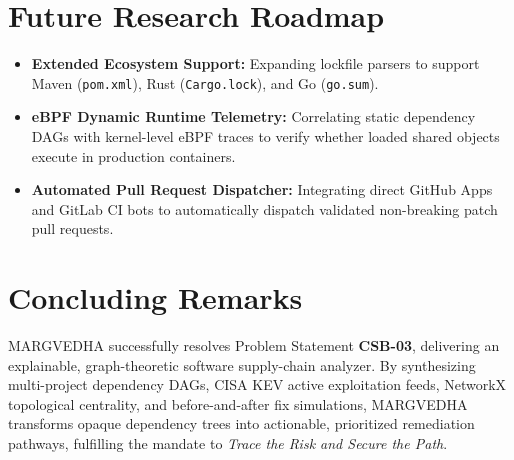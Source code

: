 \documentclass[12pt,a4paper,oneside]{report}
\begin{document}
\section{Future Research Roadmap}
\begin{itemize}
    \item \textbf{Extended Ecosystem Support:} Expanding lockfile parsers to support Maven (\texttt{pom.xml}), Rust (\texttt{Cargo.lock}), and Go (\texttt{go.sum}).
    \item \textbf{eBPF Dynamic Runtime Telemetry:} Correlating static dependency DAGs with kernel-level eBPF traces to verify whether loaded shared objects execute in production containers.
    \item \textbf{Automated Pull Request Dispatcher:} Integrating direct GitHub Apps and GitLab CI bots to automatically dispatch validated non-breaking patch pull requests.
\end{itemize}

\section{Concluding Remarks}
MARGVEDHA successfully resolves Problem Statement \textbf{CSB-03}, delivering an explainable, graph-theoretic software supply-chain analyzer. By synthesizing multi-project dependency DAGs, CISA KEV active exploitation feeds, NetworkX topological centrality, and before-and-after fix simulations, MARGVEDHA transforms opaque dependency trees into actionable, prioritized remediation pathways, fulfilling the mandate to \textit{Trace the Risk and Secure the Path}.

\clearpage


\end{document}
